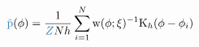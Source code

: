 \begin{equation*}
  {\textcolor{mymidblue}{\hat{\pd}}}(\phi) = 
  \frac{1}{\textcolor{mymidblue}{Z}Nh} 
    \sum\limits_{i=1}^{N} \w(\phi;\xi)^{-1} \text{K}_{h}(\phi - \phi_{i})
\end{equation*}